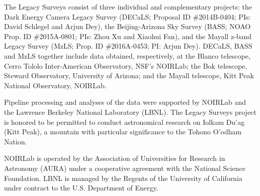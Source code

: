 \documentclass[twocolumn]{aastex631}
\begin{document}
The Legacy Surveys consist of three individual and complementary projects: the Dark Energy Camera Legacy Survey (DECaLS; Proposal ID \#2014B-0404; PIs: David Schlegel and Arjun Dey), the Beijing-Arizona Sky Survey (BASS; NOAO Prop. ID \#2015A-0801; PIs: Zhou Xu and Xiaohui Fan), and the Mayall z-band Legacy Survey (MzLS; Prop. ID \#2016A-0453; PI: Arjun Dey). DECaLS, BASS and MzLS together include data obtained, respectively, at the Blanco telescope, Cerro Tololo Inter-American Observatory, NSF’s NOIRLab; the Bok telescope, Steward Observatory, University of Arizona; and the Mayall telescope, Kitt Peak National Observatory, NOIRLab. 

Pipeline processing and analyses of the data were supported by NOIRLab and the Lawrence Berkeley National Laboratory (LBNL). The Legacy Surveys project is honored to be permitted to conduct astronomical research on Iolkam Du’ag (Kitt Peak), a mountain with particular significance to the Tohono O’odham Nation.

NOIRLab is operated by the Association of Universities for Research in Astronomy (AURA) under a cooperative agreement with the National Science Foundation. LBNL is managed by the Regents of the University of California under contract to the U.S. Department of Energy.
\end{document}
